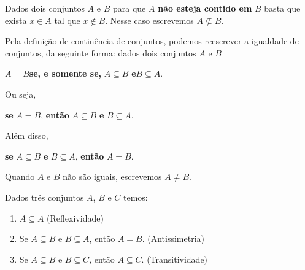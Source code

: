 \documentclass{beamer}
\begin{document}
    \begin{frame}

        \begin{observacao}
            Dados dois conjuntos $A$ e $B$ \pause para que $A$ \textbf{não esteja contido em} $B$ basta \pause que exista $x \in A$ tal que $x \notin B$. \pause Nesse caso escrevemos $A \nsubseteq B$.
        \end{observacao}
    \end{frame}
    \begin{frame}
        \vspace{.4cm}
        Pela definição de continência de conjuntos, \pause podemos reescrever a igualdade de conjuntos, da seguinte forma: \pause dados dois conjuntos $A$ e $B$\pause
        \begin{center}
            $A = B$\quad \textbf{se, e somente se,} \pause\quad $A \subseteq B$ \quad\pause \textbf{e}\quad $B \subseteq A$.\pause
        \end{center}

        Ou seja,
        \begin{center}
            \textbf{se} $A = B$, \textbf{então} $A \subseteq B$ \textbf{e} $B \subseteq A$.\pause
        \end{center}

        Além disso,
        \begin{center}
            \textbf{se} $A \subseteq B$ \textbf{e} $B \subseteq A$, \textbf{então} $A = B$.\pause
        \end{center}

        Quando $A$ e $B$ não são iguais, escrevemos $A \neq B$.\pause

        \begin{proposicao}
            Dados três conjuntos $A$, $B$ e $C$ temos:\pause
            \begin{enumerate}[label={\roman*})]
                \item $A\subseteq A$ (Reflexividade)\pause
                \item Se $A\subseteq B \mbox{ e } B\subseteq A$, então $A=B$. (Antissimetria)\pause
                \item Se $A\subseteq B$ e $B\subseteq C$, então $A\subseteq C$. (Transitividade)
            \end{enumerate}
        \end{proposicao}
    \end{frame}
\end{document}
